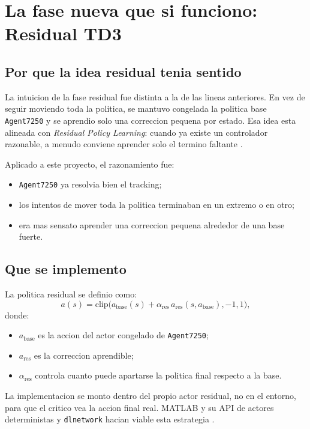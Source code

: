 \documentclass[11pt,a4paper]{article}
\begin{document}
\section{La fase nueva que si funciono: Residual TD3}

\subsection{Por que la idea residual tenia sentido}

La intuicion de la fase residual fue distinta a la de las lineas anteriores. En vez de seguir moviendo toda la politica, se mantuvo congelada la politica base \texttt{Agent7250} y se aprendio solo una correccion pequena por estado. Esa idea esta alineada con \emph{Residual Policy Learning}: cuando ya existe un controlador razonable, a menudo conviene aprender solo el termino faltante \citep{silver2018residual,schaff2020shared,resfit2025}.

Aplicado a este proyecto, el razonamiento fue:
\begin{itemize}[leftmargin=1.5em]
\item \texttt{Agent7250} ya resolvia bien el tracking;
\item los intentos de mover toda la politica terminaban en un extremo o en otro;
\item era mas sensato aprender una correccion pequena alrededor de una base fuerte.
\end{itemize}

\subsection{Que se implemento}

La politica residual se definio como:
\[
a(s) = \mathrm{clip}\Big(a_{\mathrm{base}}(s) + \alpha_{\mathrm{res}}\,a_{\mathrm{res}}(s,a_{\mathrm{base}}), -1, 1\Big),
\]
donde:
\begin{itemize}[leftmargin=1.5em]
\item \(a_{\mathrm{base}}\) es la accion del actor congelado de \texttt{Agent7250};
\item \(a_{\mathrm{res}}\) es la correccion aprendible;
\item \(\alpha_{\mathrm{res}}\) controla cuanto puede apartarse la politica final respecto a la base.
\end{itemize}

La implementacion se monto dentro del propio actor residual, no en el entorno, para que el critico vea la accion final real. MATLAB y su API de actores deterministas y \texttt{dlnetwork} hacian viable esta estrategia \citep{mathworks_continuous_actor,mathworks_function_layer}.
\end{document}
